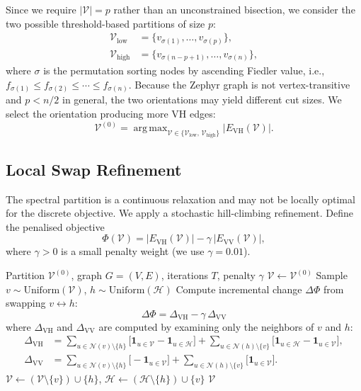 \documentclass[11pt,a4paper]{article}
\DeclareMathOperator*{\argmax}{arg\,max}
\newcommand{\N}{\mathcal{N}}
\newcommand{\VV}{\mathcal{V}}
\newcommand{\HH}{\mathcal{H}}
\begin{document}
Since we require $|\VV|=p$ rather than an unconstrained bisection, we consider the two possible threshold-based partitions of size $p$:
\begin{align}
  \VV_{\mathrm{low}}  &= \{ v_{\sigma(1)},\ldots,v_{\sigma(p)} \}, \label{eq:vislow}\\
  \VV_{\mathrm{high}} &= \{ v_{\sigma(n-p+1)},\ldots,v_{\sigma(n)} \}, \label{eq:vishigh}
\end{align}
where $\sigma$ is the permutation sorting nodes by ascending Fiedler value, i.e., $f_{\sigma(1)} \leq f_{\sigma(2)} \leq \cdots \leq f_{\sigma(n)}$.  Because the Zephyr graph is not vertex-transitive and $p<n/2$ in general, the two orientations may yield different cut sizes.  We select the orientation producing more VH edges:
\begin{equation}\label{eq:specselect}
  \VV^{(0)} = \argmax_{\VV \in \{\VV_{\mathrm{low}},\,\VV_{\mathrm{high}}\}} |E_{\mathrm{VH}}(\VV)|.
\end{equation}

\subsection{Local Swap Refinement}\label{sec:refine}

The spectral partition is a continuous relaxation and may not be locally optimal for the discrete objective.  We apply a stochastic hill-climbing refinement.  Define the penalised objective
\begin{equation}\label{eq:swapobj}
  \Phi(\VV) = |E_{\mathrm{VH}}(\VV)| - \gamma\,|E_{\mathrm{VV}}(\VV)|,
\end{equation}
where $\gamma > 0$ is a small penalty weight (we use $\gamma=0.01$).

\begin{algorithm}[H]
\caption{Stochastic Swap Refinement}\label{alg:refine}
\begin{algorithmic}[1]
\Require Partition $\VV^{(0)}$, graph $G=(V,E)$, iterations $T$, penalty $\gamma$
\State $\VV \gets \VV^{(0)}$
  \State Sample $v \sim \mathrm{Uniform}(\VV)$, $h \sim \mathrm{Uniform}(\HH)$
  \State Compute incremental change $\Delta\Phi$ from swapping $v \leftrightarrow h$:
  \[
    \Delta\Phi = \Delta_{\mathrm{VH}} - \gamma\,\Delta_{\mathrm{VV}}
  \]
  where $\Delta_{\mathrm{VH}}$ and $\Delta_{\mathrm{VV}}$ are computed by examining only the neighbors of $v$ and $h$:
  \begin{align*}
    \Delta_{\mathrm{VH}} &= \sum_{u\in\N(v)\setminus\{h\}} \bigl[\mathbf{1}_{u\in\VV} - \mathbf{1}_{u\in\HH}\bigr]
    + \sum_{u\in\N(h)\setminus\{v\}} \bigl[\mathbf{1}_{u\in\HH} - \mathbf{1}_{u\in\VV}\bigr], \\
    \Delta_{\mathrm{VV}} &= \sum_{u\in\N(v)\setminus\{h\}} \bigl[-\mathbf{1}_{u\in\VV}\bigr]
    + \sum_{u\in\N(h)\setminus\{v\}} \bigl[\mathbf{1}_{u\in\VV}\bigr].
  \end{align*}
    \State $\VV \gets (\VV \setminus \{v\}) \cup \{h\}$, $\HH \gets (\HH \setminus \{h\}) \cup \{v\}$
  \EndIf
\EndFor
\State \Return $\VV$
\end{algorithmic}
\end{algorithm}
\end{document}
